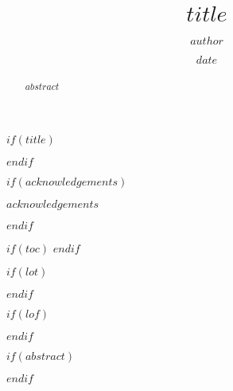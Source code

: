 \documentclass[12pt,twoside]{reedthesis}
\title{$title$}
\author{$author$}
\date{$date$}
\newcommand\blankpage{%
    \null
    \thispagestyle{empty}%
    \addtocounter{page}{-1}%
    \newpage}
\begin{document}
$if(title)$
  \maketitle
$endif$


\afterpage{\blankpage} %

\frontmatter %
\pagestyle{empty} %

$if(acknowledgements)$
  \begin{acknowledgements}
    $acknowledgements$
  \end{acknowledgements}
$endif$



$if(toc)$
  \hypersetup{linkcolor=$if(toccolor)$$toccolor$$else$black$endif$}
  \setcounter{secnumdepth}{$toc-depth$} %
  \setcounter{tocdepth}{$toc-depth$}
  \tableofcontents
$endif$


$if(lot)$
  \listoftables
$endif$


$if(lof)$
  \listoffigures
$endif$


$if(abstract)$
  \begin{abstract}
    $abstract$
  \end{abstract}
$endif$

\end{document}
